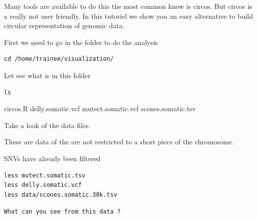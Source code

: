 \begin{description}[style=multiline,labelindent=1.5cm,align=left,leftmargin=2.5cm]
  \item[\texttt{mutect.somatic.vcf} \hfill\\]
  \item[\texttt{delly.somatic.vcf} \hfill\\]
  \item[\texttt{scones.somatic.tsv} \hfill\\] 
\end{description}





Many tools are available to do this the most common know is circos. But circos is a really not user friendly. In this tutoriel we show you an easy alternative to build circular representation of genomic data.

First we need to go in the folder to do the analysis

\begin{steps}
\begin{lstlisting}
cd /home/trainee/visualization/
\end{lstlisting}
\end{steps}

Let see what is in this folder

\begin{steps}
\begin{lstlisting}
ls
\end{lstlisting}
\end{steps}

circos.R delly.somatic.vcf mutect.somatic.vcf scones.somatic.tsv

Take a look of the data files.

These are data of the are not restricted to a short piece of the chromosome.

SNVs have already been filtered 

\begin{steps}
\begin{lstlisting}
less mutect.somatic.tsv
less delly.somatic.vcf
less data/scones.somatic.30k.tsv
\end{lstlisting}
\end{steps}


\begin{questions}
\texttt{What can you see from this data ?}
\end{questions}


